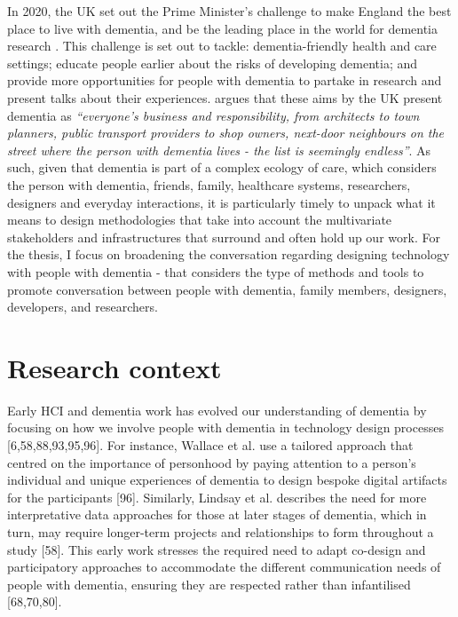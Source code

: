 In 2020, the UK set out the Prime Minister's challenge to make England the best place to live with dementia, and be the leading place in the world for dementia research \citep{budgett2021designing}. This challenge is set out to tackle: dementia-friendly health and care settings; educate people earlier about the risks of developing dementia; and provide more opportunities for people with dementia to partake in research and present talks about their experiences. \cite{keady2017social} argues that these aims by the UK present dementia as \textit{``everyone's business and responsibility, from architects to town planners, public transport providers to shop owners, next-door neighbours on the street where the person with dementia lives - the list is seemingly endless''}. As such, given that dementia is part of a complex ecology of care, which considers the person with dementia, friends, family, healthcare systems, researchers, designers and everyday interactions, it is particularly timely to unpack what it means to design methodologies that take into account the multivariate stakeholders and infrastructures that surround and often hold up our work. For the thesis, I focus on broadening the conversation regarding designing technology with people with dementia - that considers the type of methods and tools to promote conversation between people with dementia, family members, designers, developers, and researchers.

\section{Research context}
\label{Intro: ResearchContext}
Early HCI and dementia work has evolved our understanding of dementia by focusing on how we involve people with dementia in technology design processes [6,58,88,93,95,96]. For instance, Wallace et al. use a tailored approach that centred on the importance of personhood by paying attention to a person’s individual and unique experiences of dementia to design bespoke digital artifacts for the participants [96]. Similarly, Lindsay et al. describes the need for more interpretative data approaches for those at later stages of dementia, which in turn, may require longer-term projects and relationships to form throughout a study [58]. This early work stresses the required need to adapt co-design and participatory approaches to accommodate the different communication needs of people with dementia, ensuring they are respected rather than infantilised [68,70,80]. 

